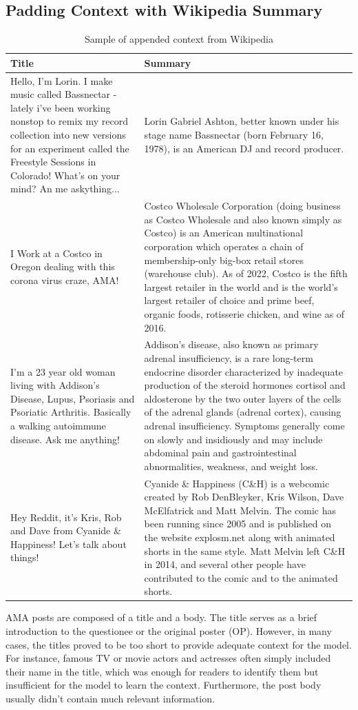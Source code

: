 \documentclass[paper=a4, fontsize=11pt]{scrartcl}
\numberwithin{equation}{section}		%
\numberwithin{figure}{section}			%
\numberwithin{table}{section}				%
\begin{document}
\subsection*{Padding Context with Wikipedia Summary}
\begin{table}
\centering
\tiny
\begin{tabular}{p{5cm}p{5cm}}
  \hline
  \textbf{Title} & \textbf{Summary} \\
  \hline
  \hline
  Hello, I'm Lorin. I make music called Bassnectar - lately i've been working nonstop to remix my record collection into new versions for an experiment called the Freestyle Sessions in Colorado! What's on your mind? An me askything... & Lorin Gabriel Ashton, better known under his stage name Bassnectar (born February 16, 1978), is an American DJ and record producer. \\
  \hline
  I Work at a Costco in Oregon dealing with this corona virus craze, AMA! & Costco Wholesale Corporation (doing business as Costco Wholesale and also known simply as Costco) is an American multinational corporation which operates a chain of membership-only big-box retail stores (warehouse club). As of 2022, Costco is the fifth largest retailer in the world and is the world's largest retailer of choice and prime beef, organic foods, rotisserie chicken, and wine as of 2016. \\
  \hline
  I’m a 23 year old woman living with Addison’s Disease, Lupus, Psoriasis and Psoriatic Arthritis. Basically a walking autoimmune disease. Ask me anything! & Addison's disease, also known as primary adrenal insufficiency, is a rare long-term endocrine disorder characterized by inadequate production of the steroid hormones cortisol and aldosterone by the two outer layers of the cells of the adrenal glands (adrenal cortex), causing adrenal insufficiency. Symptoms generally come on slowly and insidiously and may include abdominal pain and gastrointestinal abnormalities, weakness, and weight loss. \\
  \hline
  Hey Reddit, it’s Kris, Rob and Dave from Cyanide \& Happiness! Let’s talk about things! & Cyanide \& Happiness (C\&H) is a webcomic created by Rob DenBleyker, Kris Wilson, Dave McElfatrick and Matt Melvin. The comic has been running since 2005 and is published on the website explosm.net along with animated shorts in the same style. Matt Melvin left C\&H in 2014, and several other people have contributed to the comic and to the animated shorts.  \\
  \hline
  \hline
  \end{tabular}
  \caption{Sample of appended context from Wikipedia}
  \label{tab:wiki_sample}
\end{table}
AMA posts are composed of a title and a body. The title serves as a brief introduction to the questionee or the original poster (OP). However, in many cases, the titles proved to be too short to provide adequate context for the model. For instance, famous TV or movie actors and actresses often simply included their name in the title, which was enough for readers to identify them but insufficient for the model to learn the context. Furthermore, the post body usually didn't contain much relevant information.
\end{document}
